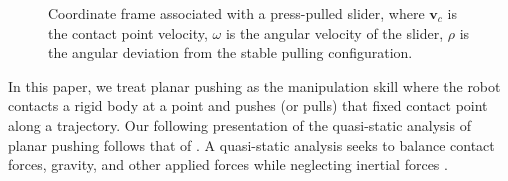 \documentclass[conference]{IEEEtran}
\newcommand{\BB}[1]{{\color{red} {Byron: {#1}}}}
\begin{document}
\begin{figure}[t]
  \centering
  \def\iangle{35} %
  \caption{Coordinate frame associated with a press-pulled slider,
    where $\mathbf{v}_c$ is the contact point velocity, $\omega$ is
    the angular velocity of the slider, $\rho$ is the angular
    deviation from the stable pulling configuration.}
  \label{fig:presspull-motion}
\end{figure}

In this paper, we treat planar pushing as the manipulation skill where
the robot contacts a rigid body at a point and pushes (or pulls) that
fixed contact point along a trajectory.
Our following presentation of the quasi-static analysis of planar
pushing follows that of \cite{alexander1993bounds, Mason}. A
quasi-static analysis seeks to balance contact forces, gravity, and
other applied forces while neglecting inertial forces \cite{Mason}.
\end{document}
